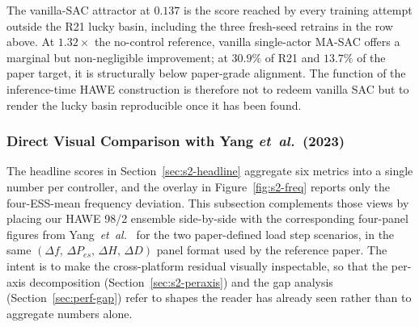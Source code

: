 \documentclass{unnc-fyp}
\begin{document}
The vanilla-SAC attractor at $0.137$ is the score reached by every
training attempt outside the R21 lucky basin, including the three
fresh-seed retrains in the row above.
At $1.32\times$ the no-control reference, vanilla single-actor
MA-SAC offers a marginal but non-negligible improvement; at
$30.9\%$ of R21 and $13.7\%$ of the paper target, it is structurally
below paper-grade alignment.
The function of the inference-time HAWE construction is therefore
not to redeem vanilla SAC but to render the lucky basin
reproducible once it has been found.

\subsubsection{Direct Visual Comparison with Yang \emph{et~al.}\ (2023)}
\label{sec:s2-paper-cmp}

The headline scores in Section~\ref{sec:s2-headline} aggregate six
metrics into a single number per controller, and the overlay in
Figure~\ref{fig:s2-freq} reports only the four-ESS-mean frequency
deviation. This subsection complements those views by placing our
HAWE 98/2 ensemble side-by-side with the corresponding four-panel
figures from Yang~\emph{et~al.}~\cite{yang2023ddic} for the two
paper-defined load step scenarios, in the same
$(\Delta f,\, \Delta P_{es},\, \Delta H,\, \Delta D)$ panel format
used by the reference paper. The intent is to make the cross-platform
residual visually inspectable, so that the per-axis decomposition
(Section~\ref{sec:s2-peraxis}) and the gap analysis
(Section~\ref{sec:perf-gap}) refer to shapes the reader has already
seen rather than to aggregate numbers alone.
\end{document}
